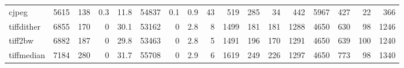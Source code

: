 \begin{tabular}{lrrrrrrrrrrrrrrrr}
 cjpeg           &     5615 &  138 &    0.3 &     11.8 &   54837 &    0.1 &      0.9 &    43 &     519 &  285 &    34 &   442 &  5967 &   427 &     22 &       366 \\
 tiffdither      &     6855 &  170 &    0   &     30.1 &   53162 &    0   &      2.8 &     8 &    1499 &  181 &   181 &  1288 &  4650 &   630 &     98 &      1246 \\
 tiff2bw         &     6882 &  187 &    0   &     29.8 &   53463 &    0   &      2.8 &     5 &    1491 &  196 &   170 &  1291 &  4650 &   639 &    100 &      1240 \\
 tiffmedian      &     7184 &  280 &    0   &     31.7 &   55708 &    0   &      2.9 &     6 &    1619 &  249 &   226 &  1297 &  4650 &   773 &     98 &      1340 \\
\hline
\end{tabular}